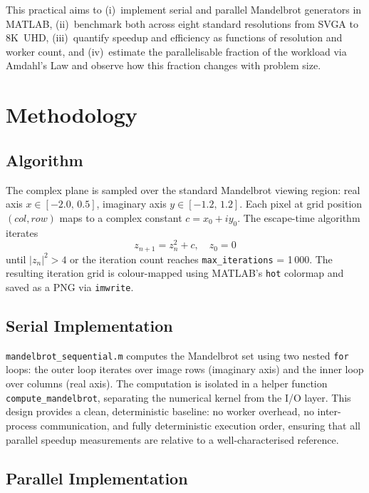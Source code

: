 \documentclass[conference]{IEEEtran}
\begin{document}
This practical aims to (i)~implement serial and parallel Mandelbrot
generators in MATLAB, (ii)~benchmark both across eight standard resolutions
from SVGA to 8K~UHD, (iii)~quantify speedup and efficiency as functions of
resolution and worker count, and (iv)~estimate the parallelisable fraction
of the workload via Amdahl's Law and observe how this fraction changes with
problem size.

\section{Methodology}

\subsection{Algorithm}

The complex plane is sampled over the standard Mandelbrot viewing region:
real axis $x \in [-2.0,\,0.5]$, imaginary axis $y \in [-1.2,\,1.2]$.
Each pixel at grid position $(col, row)$ maps to a complex constant
$c = x_0 + iy_0$.  The escape-time algorithm iterates
\begin{equation}
  z_{n+1} = z_n^2 + c, \quad z_0 = 0
\end{equation}
until $|z_n|^2 > 4$ or the iteration count reaches \texttt{max\_iterations}
= 1\,000.  The resulting iteration grid is colour-mapped using MATLAB's
\texttt{hot} colormap and saved as a PNG via \texttt{imwrite}.

\subsection{Serial Implementation}

\texttt{mandelbrot\_sequential.m} computes the Mandelbrot set using two
nested \texttt{for} loops: the outer loop iterates over image rows
(imaginary axis) and the inner loop over columns (real axis).  The
computation is isolated in a helper function \texttt{compute\_mandelbrot},
separating the numerical kernel from the I/O layer.  This design provides a
clean, deterministic baseline: no worker overhead, no inter-process
communication, and fully deterministic execution order, ensuring that all
parallel speedup measurements are relative to a well-characterised reference.

\subsection{Parallel Implementation}
\end{document}
